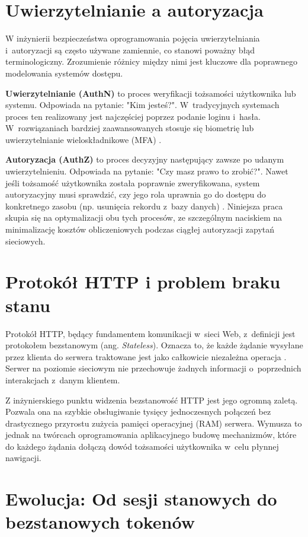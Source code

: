 \documentclass{SGGW-thesis}
\begin{document}
\section{Uwierzytelnianie a autoryzacja}

W inżynierii bezpieczeństwa oprogramowania pojęcia uwierzytelniania i~autoryzacji są często używane zamiennie, co stanowi poważny błąd terminologiczny. Zrozumienie różnicy między nimi jest kluczowe dla poprawnego modelowania systemów dostępu.

\textbf{Uwierzytelnianie (AuthN)} to proces weryfikacji tożsamości użytkownika lub systemu. Odpowiada na pytanie: "Kim jesteś?". W~tradycyjnych systemach proces ten realizowany jest najczęściej poprzez podanie loginu i~hasła. W~rozwiązaniach bardziej zaawansowanych stosuje się biometrię lub uwierzytelnianie wieloskładnikowe (MFA) \cite{ms_sec}.

\textbf{Autoryzacja (AuthZ)} to proces decyzyjny następujący zawsze po udanym uwierzytelnieniu. Odpowiada na pytanie: "Czy masz prawo to zrobić?". Nawet jeśli tożsamość użytkownika została poprawnie zweryfikowana, system autoryzacyjny musi sprawdzić, czy jego rola uprawnia go do dostępu do konkretnego zasobu (np. usunięcia rekordu z~bazy danych) \cite{oauth2}. Niniejsza praca skupia się na optymalizacji obu tych procesów, ze szczególnym naciskiem na minimalizację kosztów obliczeniowych podczas ciągłej autoryzacji zapytań sieciowych.

\section{Protokół HTTP i problem braku stanu}

Protokół HTTP, będący fundamentem komunikacji w~sieci Web, z~definicji jest protokołem bezstanowym (ang. \textit{Stateless}). Oznacza to, że każde żądanie wysyłane przez klienta do serwera traktowane jest jako całkowicie niezależna operacja \cite{fielding2000}. Serwer na poziomie sieciowym nie przechowuje żadnych informacji o~poprzednich interakcjach z~danym klientem.

Z inżynierskiego punktu widzenia bezstanowość HTTP jest jego ogromną zaletą. Pozwala ona na szybkie obsługiwanie tysięcy jednoczesnych połączeń bez drastycznego przyrostu zużycia pamięci operacyjnej (RAM) serwera. Wymusza to jednak na twórcach oprogramowania aplikacyjnego budowę mechanizmów, które do każdego żądania dołączą dowód tożsamości użytkownika w~celu płynnej nawigacji.

\section{Ewolucja: Od sesji stanowych do bezstanowych tokenów}
\end{document}
